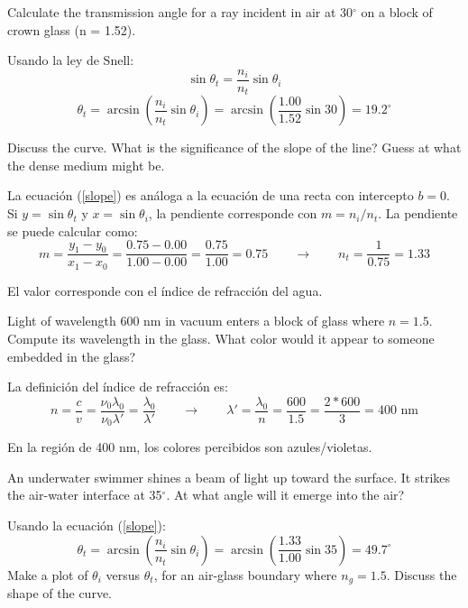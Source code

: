 \documentclass[addpoints,10pt]{exam}
\begin{document}
\begin{questions}
		{
			\question
			Calculate the transmission angle for a ray incident in air at 30$^\circ$ on a block of crown glass (n = 1.52).
		}
		
		Usando la ley de Snell:
		\begin{equation}\label{slope}
			\sin\theta_t = \dfrac{n_i}{n_t}\sin\theta_i
		\end{equation}
		\begin{equation}
			\theta_t = \arcsin\left(\dfrac{n_i}{n_t}\sin\theta_i\right) = \arcsin\left(\dfrac{1.00}{1.52}\sin30\right) = 19.2 ^\circ
		\end{equation}
		
		{
			\question
			Discuss the curve.
			What is the significance of the slope of the line? Guess at what the dense medium might be.
		}
		
		La ecuaci\'on (\ref{slope}) es an\'aloga a la ecuaci\'on de una recta con intercepto $b = 0$. Si $y = \sin \theta_t$ y $x = \sin \theta_i$, la pendiente corresponde con $m = n_i/n_t$. La pendiente se puede calcular como:
		\begin{equation}
			m = \dfrac{y_1 - y_0}{x_1 - x_0} = \dfrac{0.75 - 0.00}{1.00 - 0.00} = \dfrac{0.75}{1.00} = 0.75 \qquad \longrightarrow \qquad n_t = \dfrac{1}{0.75} = 1.33
		\end{equation}
		
		El valor corresponde con el \'indice de refracci\'on del agua.
		
		{
			\question
			Light of wavelength 600 nm in vacuum enters a block of glass where $n = 1.5$. Compute its wavelength in the glass. What color would it appear to someone embedded in the glass?
		}
		
		La definici\'on del \'indice de refracci\'on es:
		\begin{equation}
			n = \dfrac{c}{v} = \dfrac{\nu_0\lambda_0}{\nu_0\lambda'} = \dfrac{\lambda_0}{\lambda'} \qquad \longrightarrow \qquad \lambda' = \dfrac{\lambda_0}{n} = \dfrac{600}{1.5} = \dfrac{2 * 600}{3} = 400 \text{ nm}
		\end{equation}
		
		En la regi\'on de 400 nm, los colores percibidos son azules/violetas.
		
		{
			\question
			An underwater swimmer shines a beam of light up toward the
			surface. It strikes the air-water interface at 35$^\circ$. At what angle will it	emerge into the air?
		}
		
		Usando la ecuaci\'on (\ref{slope}):
		\begin{equation}
			\theta_t = \arcsin\left(\dfrac{n_i}{n_t}\sin\theta_i\right) = \arcsin\left(\dfrac{1.33}{1.00}\sin35\right) = 49.7 ^\circ
		\end{equation}
		{
			\question
			Make a plot of $\theta_i$ versus $\theta_t$, for an air-glass boundary where
			$n_{g} = 1.5$. Discuss the shape of the curve.
		}
		

\end{questions}
\end{document}
